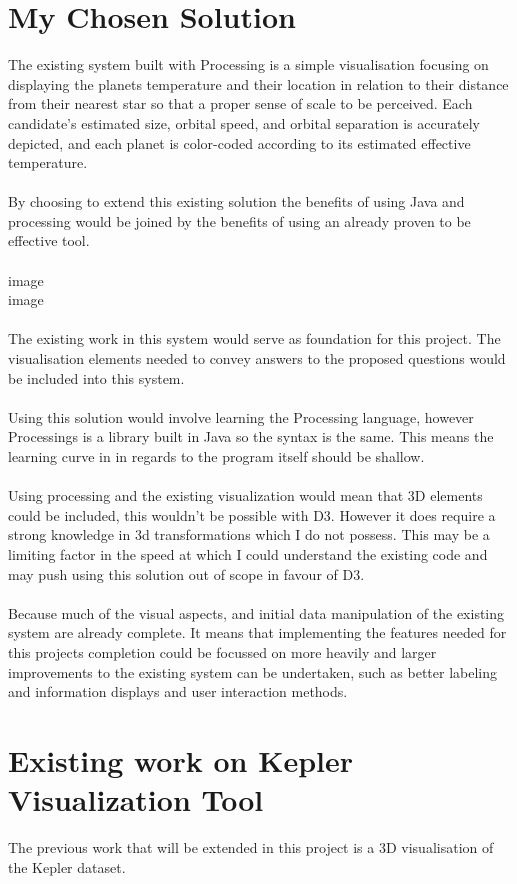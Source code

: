\documentclass[11pt
              , a4paper
              , twoside
              , openright
              ]{report}
\begin{document}
\section{My Chosen Solution}
The existing system built with Processing is a simple visualisation focusing on displaying the planets temperature and their location in relation to their distance from their nearest star so that a proper sense of scale to be perceived. Each candidate’s estimated size, orbital speed, and orbital separation is accurately depicted, and each planet is color-coded according to its estimated effective temperature.
\\\\
By choosing to extend this existing solution the benefits of using Java and processing would be joined by the benefits of using an already proven to be effective tool. 
\\\\
image\\
image
\\\\
The existing work in this system would serve as foundation for this project. The visualisation elements needed to convey answers to the proposed questions would be included into this system.
\\\\
Using this solution would involve learning the Processing language, however Processings is a library built in Java so the syntax is the same. This means the learning curve in in regards to the program itself should be shallow.
\\\\
Using processing and the existing visualization would mean that 3D elements could be included, this wouldn’t be possible with D3. However it does require a strong knowledge in 3d transformations which I do not possess. This may be a limiting factor in the speed at which I could understand the existing code and may push using this solution out of scope in favour of D3.
\\\\
Because much of the visual aspects, and initial data manipulation of the existing system are already complete. It means that implementing the features needed for this projects completion could be focussed on more heavily and larger improvements to the existing system can be undertaken, such as better labeling and information displays and user interaction methods.
\section{Existing work on Kepler Visualization Tool}
The previous work that will be extended in this project is a 3D visualisation of the Kepler dataset.
\end{document}
